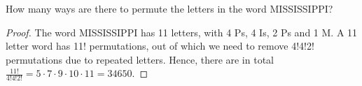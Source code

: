   \begin{exercise}{1}
  How many ways are there to permute the letters in the word MISSISSIPPI?
  \end{exercise}

  \begin{proof}
  The word MISSISSIPPI has 11 letters, with 4 Ps, 4 Is, 2 Ps and 1 M. A 11 letter word has 11! permutations, out of which we need to remove 4!4!2! permutations due to repeated letters. Hence, there are in total $\frac{11!}{4!4!2!} =
  5 \cdot 7 \cdot 9 \cdot 10 \cdot 11 = 34650$.
  \end{proof}

